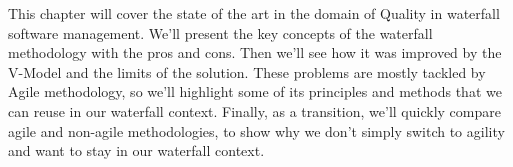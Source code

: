 This chapter will cover the state of the art in the domain of Quality in
waterfall software management.
We'll present the key concepts of the waterfall methodology with the pros and
cons.
Then we'll see how it was improved by the V-Model and the limits of the
solution.
These problems are mostly tackled by Agile methodology, so we'll highlight
some of its principles and methods that we can reuse in our waterfall context.
Finally, as a transition, we'll quickly compare agile and non-agile
methodologies, to show why we don't simply switch to agility and want to stay
in our waterfall context.






